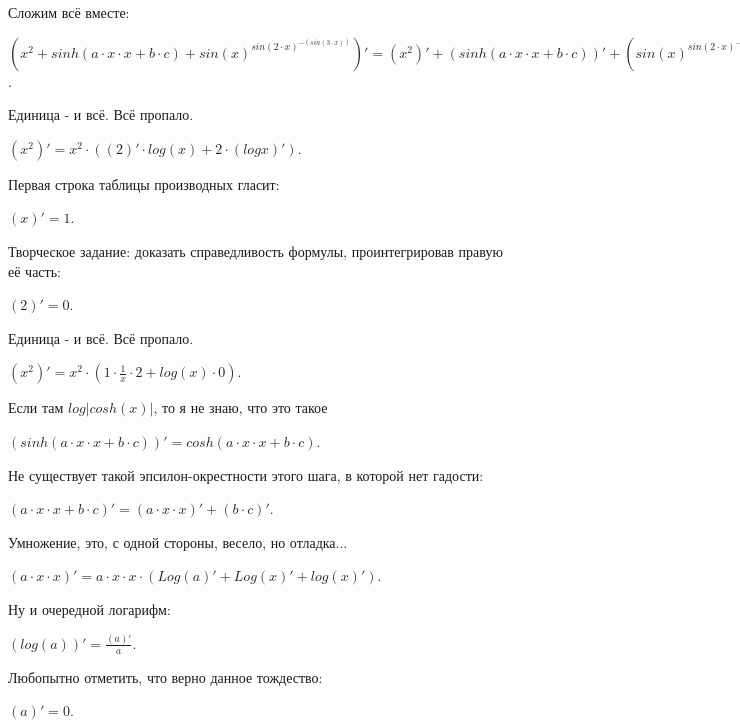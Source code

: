 \documentclass{article}
\begin{document}
Сложим всё вместе:\\
\begin{center}$({x^{{2}}}+sinh(a \cdot x \cdot x+b \cdot c)+{sin(x)^{sin({2} \cdot x)^{-(sin({3} \cdot x))}}})'=({x^{{2}}})' + (sinh(a \cdot x \cdot x+b \cdot c))' + ({sin(x)^{sin({2} \cdot x)^{-(sin({3} \cdot x))}}})'$.\end{center}Единица - и всё. Всё пропало.\\
\begin{center}$({x^{{2}}})'={x^{{2}}} \cdot (({{2}})'\cdot log(x) + {{2}} \cdot (logx)')$.\end{center}
Первая строка таблицы производных гласит:\\
\begin{center}$(x)' = 1$.\end{center}
Творческое задание: доказать справедливость формулы, проинтегрировав правую её часть:\\
\begin{center}$({2})' = 0$.\end{center}
Единица - и всё. Всё пропало.\\
\begin{center}$({x^{{2}}})'= {x^{{2}}} \cdot ({1} \cdot  \frac {1} {{x}} \cdot {{2}}+log(x) \cdot {0})$.\end{center}
Если там $log|cosh(x)|$, то я не знаю, что это такое\\
\begin{center}$(sinh(a \cdot x \cdot x+b \cdot c))'= cosh(a \cdot x \cdot x+b \cdot c)$.\end{center}
Не существует такой эпсилон-окрестности этого шага, в которой нет гадости:\\
\begin{center}$(a \cdot x \cdot x+b \cdot c)'=(a \cdot x \cdot x)' + (b \cdot c)'$.\end{center}Умножение, это, с одной стороны, весело, но отладка...\\
\begin{center}$(a \cdot x \cdot x)'=a \cdot x \cdot x\cdot (Log(a)' + Log(x)' + log(x)')$.\end{center}
Ну и очередной логарифм:\\
\begin{center}$(log(a))'= \frac { (a)'} {a}$.\end{center}
Любопытно отметить, что верно данное тождество:\\
\begin{center}$(a)' = 0$.\end{center}
\end{document}
